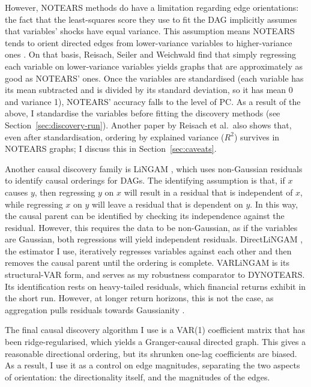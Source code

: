 \documentclass[11pt, a4paper]{report}
\begin{document}
However, NOTEARS methods do have a limitation regarding edge orientations: the fact that the least-squares score they use to fit the DAG implicitly assumes that variables' shocks have equal variance. This assumption means NOTEARS tends to orient directed edges from lower-variance variables to higher-variance ones \cite{peters2014identifiability}. On that basis, Reisach, Seiler and Weichwald \cite{reisach2021beware} find that simply regressing each variable on lower-variance variables yields graphs that are approximately as good as NOTEARS' ones. Once the variables are standardised (each variable has its mean subtracted and is divided by its standard deviation, so it has mean 0 and variance 1), NOTEARS' accuracy falls to the level of PC. As a result of the above, I standardise the variables before fitting the discovery methods (see Section~\ref{sec:discovery-run}). Another paper by Reisach et al.\ also shows that, even after standardisation, ordering by explained variance ($R^2$) survives in NOTEARS graphs; I discuss this in Section~\ref{sec:caveats}.

Another causal discovery family is LiNGAM \cite{shimizu2006lingam}, which uses non-Gaussian residuals to identify causal orderings for DAGs. The identifying assumption is that, if $x$ causes $y$, then regressing $y$ on $x$ will result in a residual that is independent of $x$, while regressing $x$ on $y$ will leave a residual that is dependent on $y$. In this way, the causal parent can be identified by checking its independence against the residual. However, this requires the data to be non-Gaussian, as if the variables are Gaussian, both regressions will yield independent residuals. DirectLiNGAM \cite{shimizu11directlingam}, the estimator I use, iteratively regresses variables against each other and then removes the causal parent until the ordering is complete.
VARLiNGAM \cite{hyvarinen2010varlingam} is its structural-VAR form, and serves as my robustness comparator to DYNOTEARS. Its identification rests on heavy-tailed residuals, which financial returns exhibit in the short run. However, at longer return horizons, this is not the case, as aggregation pulls residuals towards Gaussianity \cite{cont2001stylized}.

The final causal discovery algorithm I use is a VAR(1) coefficient matrix that has been ridge-regularised, which yields a Granger-causal
\cite{granger1969investigating} directed graph. 
This gives a reasonable directional ordering, 
but its shrunken one-lag coefficients are biased. 
As a result, I use it as a control on edge magnitudes, separating the two aspects of orientation:
the directionality itself, and the magnitudes of the edges.
\end{document}

